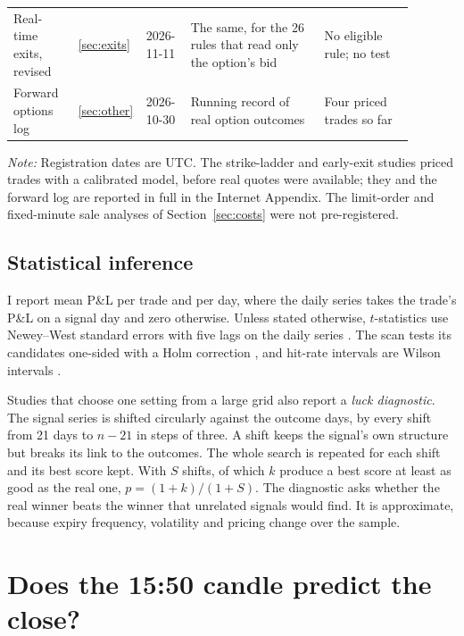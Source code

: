\documentclass[12pt,letterpaper]{article}
\newcommand{\tabnotes}[1]{\par\vspace{5pt}\parbox{\linewidth}{\footnotesize\setlength{\parindent}{0pt}\textit{Note:} #1}\par}
\begin{document}
\begin{table}[htbp]
\begin{tabular}{@{}L{0.16\linewidth}L{0.07\linewidth}L{0.11\linewidth}L{0.33\linewidth}L{0.22\linewidth}@{}}
Real-time exits, revised & \ref{sec:exits} & 2026-11-11 & The same, for the 26 rules that read only the option's bid & No eligible rule; no test \\
Forward options log & \ref{sec:other} & 2026-10-30 & Running record of real option outcomes & Four priced trades so far \\
\bottomrule
\end{tabular}
\tabnotes{Registration dates are UTC. The strike-ladder and early-exit studies
priced trades with a calibrated model, before real quotes were available; they
and the forward log are reported in full in the Internet Appendix. The
limit-order and fixed-minute sale analyses of Section~\ref{sec:costs} were not
pre-registered.}
\end{table}

\subsection{Statistical inference}
\label{sec:inference}

I report mean P\&L per trade and per day, where the daily series takes the
trade's P\&L on a signal day and zero otherwise. Unless stated otherwise,
$t$-statistics use Newey--West standard errors with five lags on the daily series
\citep{neweywest1987}. The scan tests its candidates one-sided with a Holm
correction \citep{holm1979}, and hit-rate intervals are Wilson intervals
\citep{wilson1927}.

Studies that choose one setting from a large grid also report a \emph{luck
diagnostic}. The signal series is shifted circularly against the outcome days,
by every shift from 21 days to $n - 21$ in steps of three. A shift keeps the
signal's own structure but breaks its link to the outcomes. The whole search is
repeated for each shift and its best score kept. With $S$ shifts, of which $k$
produce a best score at least as good as the real one, $p = (1 + k)/(1 + S)$.
The diagnostic asks whether the real winner beats the winner that unrelated
signals would find. It is approximate, because expiry frequency, volatility and
pricing change over the sample.

\section{Does the 15:50 candle predict the close?}
\label{sec:scan}
\end{document}

